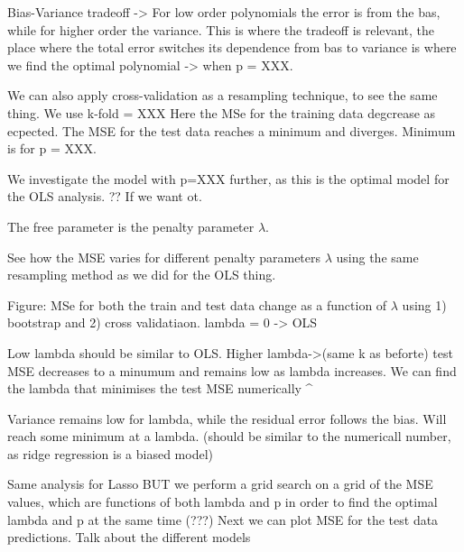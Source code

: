 \documentclass[reprint,english,notitlepage]{revtex4-1}  %
\begin{document}
Bias-Variance tradeoff -> For low order polynomials the error is from the bas, while for higher order the variance. This is where the tradeoff is relevant, the place where the total error switches its dependence from bas to variance is where we find the optimal polynomial -> when p = XXX. 

We can also apply cross-validation as a resampling technique, to see the same thing. We use k-fold = XXX 
Here the MSe for the training data degcrease as ecpected. The MSE for the test data reaches a minimum and diverges. Minimum is for p = XXX. 

We investigate the model with p=XXX further, as this is the optimal model for the OLS analysis. ?? If we want ot. 



The free parameter is the penalty parameter $\lambda$. 


See how the MSE varies for different penalty parameters $\lambda$ using the same resampling method as we did for the OLS thing. 

Figure: MSe for both the train and test data change as a function of $\lambda$ using 1) bootstrap and 2) cross validatiaon. 
lambda = 0 -> OLS 

Low lambda should be similar to OLS. 
Higher lambda->(same k as beforte) test MSE decreases to a minumum and remains low as lambda increases. We can find the lambda that minimises the test MSE numerically \lambda^ 


Variance remains low for lambda, while the residual error follows the bias. Will reach some minimum at a lambda. (should be similar to the numericall number, as ridge regression is a biased model) 


Same analysis for Lasso BUT we perform a grid search on a grid of the MSE values, which are functions of both lambda and p in order to find the optimal lambda and p at the same time (???) 
Next we can plot MSE for the test data predictions. 
Talk about the different models 
\end{document}
